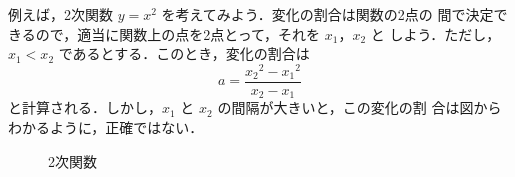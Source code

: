             例えば，2次関数 $y=x^{2}$ を考えてみよう．変化の割合は関数の2点の
            間で決定できるので，適当に関数上の点を2点とって，それを $x_{1}$，$x_{2}$ と
            しよう．ただし，$x_{1}<x_{2}$ であるとする．このとき，変化の割合は
            \begin{equation*}
                a = \frac{{x_{2}}^{2}-{x_{1}}^{2}}{x_{2}-x_{1}}
            \end{equation*}
            と計算される．しかし，$x_{1}$ と $x_{2}$ の間隔が大きいと，この変化の割
            合は図からわかるように，正確ではない．
                        \begin{figure}[hbt]
                            \begin{center}
                                \caption{2次関数}
                                \label{fig:2jikannsuu}
                            \end{center}
                        \end{figure}

